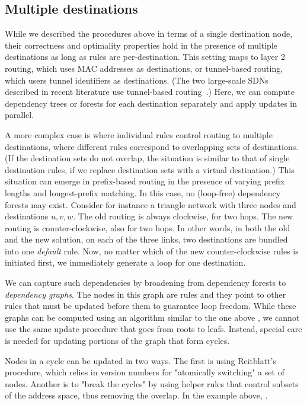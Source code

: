 \subsection{Multiple destinations}

While we described the procedures above in terms of a single destination node, their correctness and optimality properties hold in the presence of multiple destinations as long as rules are per-destination. This setting maps to layer 2 routing, which uses MAC addresses as destinations, or tunnel-based routing, which users tunnel identifiers as destinations. (The two large-scale SDNs described in recent literature use tunnel-based routing~\cite{swan,b4}.) Here, we can compute dependency trees or forests for each destination separately and apply updates in parallel.

A more complex case is where individual rules control routing to multiple destinations, where different rules correspond to overlapping sets of destinations. (If the destination sets do not overlap, the situation is similar to that of single destination rules, if we replace destination sets with a virtual destination.) This situation can emerge in prefix-based routing in the presence of varying prefix lengths and longest-prefix matching. In this case, no (loop-free) dependency forests may exist.  Consider for instance a triangle network with three nodes and destinations $u,v,w$. The old routing is always clockwise, for two hops. The new routing is counter-clockwise, also for two hops. In other words, in both the old and the new solution, on each of the three links, two destinations are bundled into one \emph{default} rule. Now, no matter which of the new counter-clockwise rules is initiated first, we immediately generate a loop for one destination.

We can capture such dependencies by broadening from dependency forests to {\em dependency graphs}. The nodes in this graph are rules and they point to other rules that must be updated before them to guarantee loop freedom. While these graphs can be computed using an algorithm similar to the one above , we cannot use the same update procedure that goes from roots to leafs. Instead, special care is needed for updating portions of the graph that form cycles.

Nodes in a cycle can be updated in two ways. The first is using Reitblatt's procedure, which relies in version numbers for "atomically switching" a set of nodes. Another is to "break the cycles" by using helper rules that control subsets of the address space, thus removing the overlap. In the example above, .

